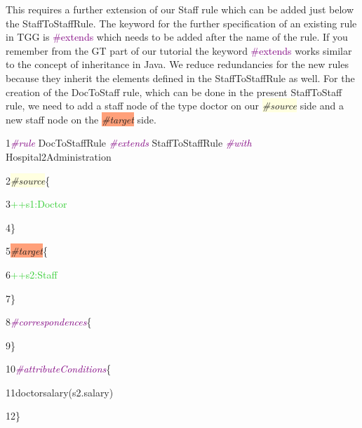 This requires a further extension of our Staff rule which can be added just below the \textsf{StaffToStaffRule}. The keyword for the further specification of an existing rule in TGG is \textcolor{Purple}{\#extends} which needs to be added after the name of the rule. If you remember from the GT part of our tutorial the keyword \textcolor{Purple}{\#extends} works similar to the concept of inheritance in Java. We reduce redundancies for the new rules because they inherit the elements defined in the \textsf{StaffToStaffRule} as well.
For the creation of the DocToStaff rule, which can be done in the present StaffToStaff rule, we need to add a staff node of the type doctor on our \colorbox{LightYellow}{\textit{\#source}} side and a new staff node on the \colorbox{LightSalmon}{\textit{\#target}} side. \newline

{

1\hspace{0.5cm}\textcolor{Purple}{\textit{\#rule}} DocToStaffRule \textcolor{Purple}{\textit{\#extends}} StaffToStaffRule \textcolor{Purple}{\textit{\#with}} Hospital2Administration

2\hspace{0.5cm}\colorbox{LightYellow}{\textit{\#source}}\{

3\hspace{1cm}\textcolor{LimeGreen}{++s1:Doctor}

4\hspace{0.5cm}\}

5\hspace{0.5cm}\colorbox{LightSalmon}{\textit{\#target}}\{

6\hspace{1cm}\textcolor{LimeGreen}{++s2:Staff}

7\hspace{0.5cm}\}

8\hspace{0.5cm}\textcolor{Purple}{\textit{\#correspondences}}\{

9\hspace{0.5cm}\}

10\hspace{0.42cm}\textcolor{Purple}{\textit{\#attributeConditions}}\{

11\hspace{1cm}doctorsalary(s2.salary)

12\hspace{0.5cm}\}\newline

}

